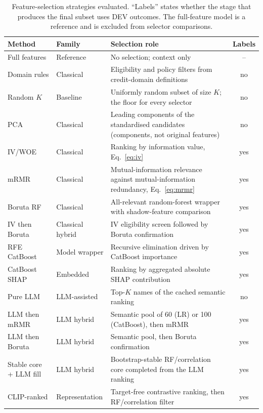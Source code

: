 \documentclass[final,5p,twocolumn]{elsarticle}
\newcommand{\Kfeat}{K}
\begin{document}
\begin{table}[htbp]
\centering
\footnotesize
\begin{threeparttable}
\caption{Feature-selection strategies evaluated. ``Labels'' states whether the stage that produces the final subset uses DEV outcomes. The full-feature model is a reference and is excluded from selector comparisons.}
\label{tab:methods}
\begin{tabular}{@{}llL{52mm}c@{}}
\toprule
Method & Family & Selection role & Labels \\
\midrule
Full features & Reference & No selection; context only & -- \\
Domain rules & Classical & Eligibility and policy filters from credit-domain definitions & no \\
Random $\Kfeat$ & Baseline & Uniformly random subset of size $\Kfeat$; the floor for every selector & no \\
PCA & Classical & Leading components of the standardised candidates (components, not original features) & no \\
IV/WOE & Classical & Ranking by information value, Eq.~\eqref{eq:iv} & yes \\
mRMR & Classical & Mutual-information relevance against mutual-information redundancy, Eq.~\eqref{eq:mrmr} & yes \\
Boruta RF & Classical & All-relevant random-forest wrapper with shadow-feature comparison & yes \\
IV then Boruta & Classical hybrid & IV eligibility screen followed by Boruta confirmation & yes \\
RFE CatBoost & Model wrapper & Recursive elimination driven by CatBoost importance & yes \\
CatBoost SHAP & Embedded & Ranking by aggregated absolute SHAP contribution & yes \\
Pure LLM & LLM-assisted & Top-$\Kfeat$ names of the cached semantic ranking & no \\
LLM then mRMR & LLM hybrid & Semantic pool of 60 (LR) or 100 (CatBoost), then mRMR & yes \\
LLM then Boruta & LLM hybrid & Semantic pool, then Boruta confirmation & yes \\
Stable core + LLM fill & LLM hybrid & Bootstrap-stable RF/correlation core completed from the LLM ranking & yes \\
CLIP-ranked & Representation & Target-free contrastive ranking, then RF/correlation filter & yes \\
\bottomrule
\end{tabular}
\end{threeparttable}
\end{table}
\end{document}
